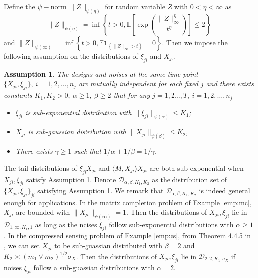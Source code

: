 \documentclass[12pt]{article}
\newtheorem{assump}{Assumption}
\begin{document}
  Define the $\psi-$norm $\|Z\|_{\psi(\eta)}$ for random variable $Z$ with $0< \eta < \infty$ as 
  \begin{equation*}
  \|Z\|_{\psi(\eta)} =\inf\left\{t>0,\mathbb{E}\left[\exp\left(\frac{\|Z\|_\infty^\eta}{t^\eta}\right)\right]\le 2
  \right\}
  \end{equation*}
  and 
$
    \|Z\|_{\psi(\infty)}=\inf\left\{t > 0,\mathbb{E} \mathbf{1}_{\left\{\|Z\|_{\infty} > t\right\}}=0\right\}.
 $
  Then we impose the following assumption on the distributions of $\xi_{j i}$ and $X_{j i}$.

  \begin{assump} 
  \label{assump_distri}
  The designs and noises at the same time point $\{X_{ji}, \xi_{ji}\},\ i=1,2,\dots,n_j$ are mutually independent for each fixed $j$ and there exists constants $K_1,K_2>0,\ \alpha\ge 1,\ \beta\ge 2$ that for any $j=1,2\dots,T,\ i=1,2,\dots,n_j$
  \begin{itemize}
  \item[1.] $\xi_{ji}$ is sub-exponential distribution with $\|\xi_{ji}\|_{\psi(\alpha)} \le K_1$;
  \item[2.] $X_{ji}$ is sub-gaussian distribution with $\|X_{ji}\|_{\psi(\beta)} \le K_2$,
  \item[3.] There exists $\gamma \ge 1$ such that $1/\alpha+ 1/\beta= 1/\gamma$.
  \end{itemize}
  \end{assump}

  The tail distributions of $\xi_{j i}X_{j i}$ and $\langle M, X_{j i}\rangle X_{j i}$ are both sub-exponential when $X_{ji},\xi_{ji}$ satisfy Assumption \ref{assump_distri}. Denote $\mathcal{D}_{\alpha,\beta,K_1,K_2}$ as the distribution set of $\{X_{ji},\xi_{ji}\}_{ji}$ satisfying Assumption \ref{assump_distri}. We remark that $\mathcal{D}_{\alpha,\beta,K_1,K_2}$ is indeed general enough for applications. In the matrix completion problem of Example \ref{emp:mc}, $X_{ji}$ are bounded with $\|X_{ji}\|_{\psi(\infty)} = 1$. Then the distributions of $X_{ji},\xi_{ji}$ lie in $ \mathcal{D}_{1,\infty,K_1,1}$ as long as the noises $\xi_{ji}$ follow sub-exponential distributions with $\alpha\ge 1$. In the compressed sensing problem of Example \ref{emp:cs}, from Theorem 4.4.5 in \cite{vershynin2018high}, we can set $X_{ji}$ to be sub-guassian distributed with $\beta=2$ and $K_2 \asymp (m_1\vee m_2)^{1/2}\sigma_X$. Then the distributions of $X_{ji},\xi_{ji}$ lie in $\mathcal{D}_{2,2,K_1,\sigma_X}$ if noises $\xi_{ji}$ follow a sub-guassian distributions with $\alpha=2$.
  
\end{document}
